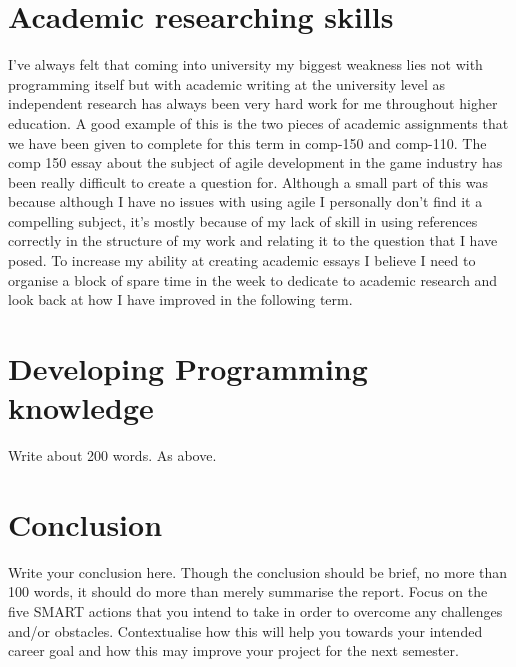 \documentclass{scrartcl}
\begin{document}
\section{Academic researching skills}

I've always felt that coming into university my biggest weakness lies not with programming itself but with academic writing at the university level as independent research has always been very hard work for me throughout higher education. A good example of this is the two pieces of academic assignments that we have been given to complete for this term in comp-150 and comp-110. The comp 150 essay about the subject of agile development in the game industry has been really difficult to create a question for. Although a small part of this was because although I have no issues with using agile I personally don't find it a compelling subject, it's mostly because of my lack of skill in using references correctly in the structure of my work and relating it to the question that I have posed. To increase my ability at creating academic essays I believe I need to organise a block of spare time in the week to dedicate to academic research and look back at how I have improved in the following term.
\section{Developing Programming knowledge}

Write about 200 words. As above.


\section{Conclusion}

Write your conclusion here. Though the conclusion should be brief, no more than 100 words, it should do more than merely summarise the report. Focus on the five SMART actions that you intend to take in order to overcome any challenges and/or obstacles. Contextualise how this will help you towards your intended career goal and how this may improve your project for the next semester.



\end{document}
